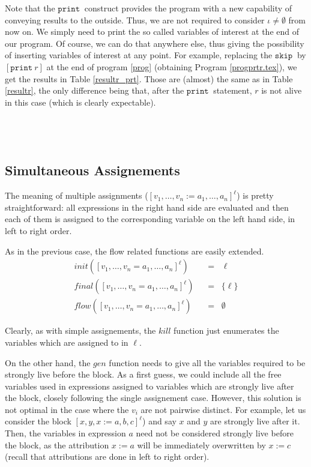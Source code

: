 \documentclass[a4wide,12pt]{article}
\def\eq{\;\; = \;\;}
\def\skip {\texttt{skip}\ }
\def\print{\texttt{print}\ }
\newcounter{Progenvcount}
\newenvironment{progenv}
                {\stepcounter{Progenvcount} \noindent {\bf Program \arabic{Progenvcount}.}\\
                 $\begin{array}{ll}}
                {\end{array}$ \\~\\ }
\def\restabR#1#2[#3]{\begin{table}\label{#3}\begin{center}\caption{#1}\begin{sideways}\end{sideways}\end{center}\end{table}}
\def\programnew#1[#2]{\begin{progenv}\label{#2}\end{progenv}}
\begin{document}
Note that the $\print$ construct provides the program with a new capability of conveying
results to the outside. Thus, we are not required to consider $\iota \neq \emptyset$ from now on.
We simply need to print the so called variables of interest at the end of our program.
Of course, we can do that anywhere else, thus giving the possibility of inserting
variables of interest at any point.
For example, replacing the $\skip$ by  $[\print r]$ at the end of program \ref{prog}
(obtaining Program \ref{progprtr.tex}),
we get the results in Table \ref{resultr_prt}. Those are (almost) the
same as in Table \ref{resultr}, the only difference being that, after the $\print$ statement,
$r$ is not alive in this case (which is clearly expectable).
 
\programnew{progprtr.tex}[progprtr]

\restabR{Strongly Live Variable Analysis on Program \ref{progprtr} (print statement) with $\iota = \emptyset$}{resultr_prt.tex}[resultr_prt]
 
\subsection{Simultaneous Assignements}
 
The meaning of multiple assignments ($[v_1,\ldots,v_n := a_1,\ldots,a_n]^\ell$) is
pretty straightforward: all expressions in the right hand side are evaluated and
then each of them is assigned to the corresponding variable on the left hand side, in left to right order.
 
As in the previous case, the flow related functions are easily extended.
\begin{align*}
init ([v_1,\ldots,v_n = a_1,\ldots,a_n]^\ell) & \eq \ell \\
final([v_1,\ldots,v_n = a_1,\ldots,a_n]^\ell) & \eq \{\ell\} \\
flow ([v_1,\ldots,v_n = a_1,\ldots,a_n]^\ell) & \eq \emptyset
\end{align*}
 
Clearly, as with simple assignements, the $kill$
function just enumerates the variables which are assigned to in $\ell$.
 
On the other hand, the
$gen$ function needs to give all the variables required to be strongly live before the block.
As a first guess, we could include all the
free variables used in expressions assigned to variables which are strongly live after the block, closely following the
single assignement case. However, this solution is not optimal in the case where the $v_i$ are not pairwise distinct.
For example, let us consider the block $[x,y,x := a,b,c]^\ell$) and say $x$ and $y$ are
strongly live after it. Then, the variables in expression
$a$ need not be considered strongly live before the block, as the attribution $x:=a$ will be immediately overwritten
by $x:=c$ (recall that attributions are done in left to right order).
 
\end{document}
